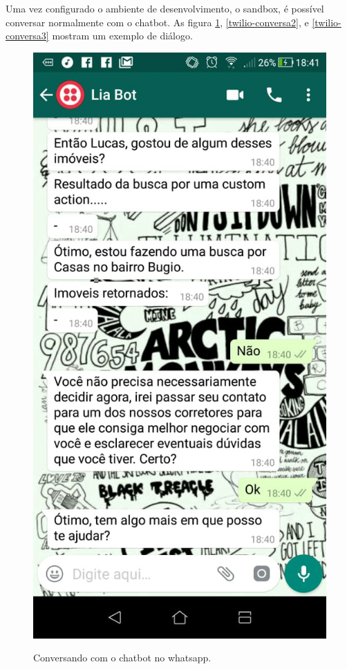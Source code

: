 Uma vez configurado o ambiente de desenvolvimento, o sandbox, é possível conversar normalmente com o chatbot. As figura \ref{twilio-conversa1}, \ref{twilio-conversa2}, e \ref{twilio-conversa3} mostram um exemplo de diálogo.


\begin{figure}[H]
  \centering
   \caption{Conversando com o chatbot no whatsapp.}
  \includegraphics[scale=0.5]{Imagens/twilio-conversa1.jpeg} 
  \label{twilio-conversa1}
\end{figure}

